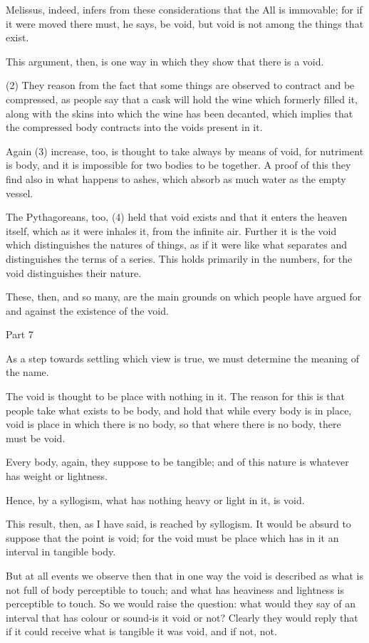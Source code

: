Melissus, indeed, infers from these considerations that the All is
immovable; for if it were moved there must, he says, be void, but
void is not among the things that exist. 

This argument, then, is one way in which they show that there is a
void. 

(2) They reason from the fact that some things are observed to contract
and be compressed, as people say that a cask will hold the wine which
formerly filled it, along with the skins into which the wine has been
decanted, which implies that the compressed body contracts into the
voids present in it. 

Again (3) increase, too, is thought to take always by means of void,
for nutriment is body, and it is impossible for two bodies to be together.
A proof of this they find also in what happens to ashes, which absorb
as much water as the empty vessel. 

The Pythagoreans, too, (4) held that void exists and that it enters
the heaven itself, which as it were inhales it, from the infinite
air. Further it is the void which distinguishes the natures of things,
as if it were like what separates and distinguishes the terms of a
series. This holds primarily in the numbers, for the void distinguishes
their nature. 

These, then, and so many, are the main grounds on which people have
argued for and against the existence of the void. 

Part 7

As a step towards settling which view is true, we must determine the
meaning of the name. 

The void is thought to be place with nothing in it. The reason for
this is that people take what exists to be body, and hold that while
every body is in place, void is place in which there is no body, so
that where there is no body, there must be void. 

Every body, again, they suppose to be tangible; and of this nature
is whatever has weight or lightness. 

Hence, by a syllogism, what has nothing heavy or light in it, is void.

This result, then, as I have said, is reached by syllogism. It would
be absurd to suppose that the point is void; for the void must be
place which has in it an interval in tangible body. 

But at all events we observe then that in one way the void is described
as what is not full of body perceptible to touch; and what has heaviness
and lightness is perceptible to touch. So we would raise the question:
what would they say of an interval that has colour or sound-is it
void or not? Clearly they would reply that if it could receive what
is tangible it was void, and if not, not. 

